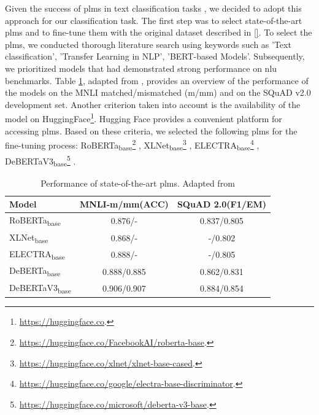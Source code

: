 Given the success of \glspl{plm} in text classification tasks \cite{textclass2021review}, we decided to adopt this approach for our classification task.
The first step was to select state-of-the-art \glspl{plm} and to fine-tune them with the original dataset described in \ref{}. To select the \glspl{plm}, we conducted thorough literature search using keywords such as 'Text classification', 'Transfer Learning in NLP', 'BERT-based Models'. Subsequently, we prioritized models that had demonstrated strong performance on \gls{nlu} benchmarks. Table \ref{tab:performance_plm}, adapted from \cite{he2021debertav3}, provides an overview of the performance of the models on the MNLI matched/mismatched (m/mm) \cite{mnli2018} and on the SQuAD v2.0 \cite{squad2018} development set.
Another criterion taken into account is the availability of the model on HuggingFace\footnote{\url{https://huggingface.co}.}. Hugging Face provides a convenient platform for accessing \glspl{plm}.
Based on these criteria, we selected the following \glspl{plm} for the fine-tuning process: RoBERTa\textsubscript{base}\footnote{\url{https://huggingface.co/FacebookAI/roberta-base}.} \cite{roberta2019}, XLNet\textsubscript{base}\footnote{\url{https://huggingface.co/xlnet/xlnet-base-cased}.} \cite{xlnet2019}, ELECTRA\textsubscript{base}\footnote{\url{https://huggingface.co/google/electra-base-discriminator}.} \cite{electra2020}, DeBERTaV3\textsubscript{base}\footnote{\url{https://huggingface.co/microsoft/deberta-v3-base}.} \cite{he2021debertav3}.

\begin{table}[h]
    \centering
    \begin{tabular}{l|cc}
    \hline
         \textbf{Model}&MNLI-m/mm(ACC)&SQuAD 2.0(F1/EM)\\
    \hline
         RoBERTa\textsubscript{base}&0.876/-&0.837/0.805\\
         XLNet\textsubscript{base}&0.868/-&-/0.802\\
         ELECTRA\textsubscript{base}&0.888/-&-/0.805\\
         DeBERTa\textsubscript{base}&0.888/0.885&0.862/0.831\\
         DeBERTaV3\textsubscript{base}&0.906/0.907&0.884/0.854\\
    \hline
    \end{tabular}
    \caption{Performance of state-of-the-art \glspl{plm}. Adapted from \cite{he2021debertav3}}
    \label{tab:performance_plm}
\end{table}

